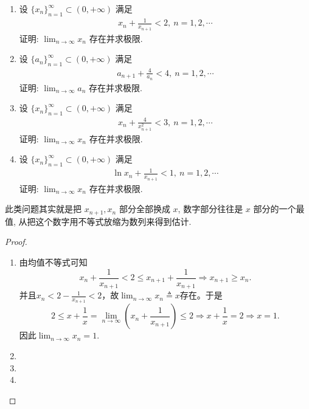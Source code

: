 \documentclass[../../main.tex]{subfiles}
\begin{document}
\begin{example}
\begin{enumerate}
\item 设 $\{x_n\}_{n=1}^{\infty} \subset (0,+\infty)$ 满足
\begin{align*}
x_n + \frac{1}{x_{n+1}} < 2,\ n = 1,2,\cdots
\end{align*}
证明: $\lim_{n \to \infty} x_n$ 存在并求极限.
\item 设 $\{a_n\}_{n=1}^{\infty} \subset (0,+\infty)$ 满足
\begin{align*}
a_{n+1} + \frac{4}{a_n} < 4,\ n = 1,2,\cdots
\end{align*}
证明: $\lim_{n \to \infty} a_n$ 存在并求极限.
\item 设 $\{x_n\}_{n=1}^{\infty} \subset (0,+\infty)$ 满足
\begin{align*}
x_n + \frac{4}{x_{n+1}^2} < 3,\ n = 1,2,\cdots
\end{align*}
证明: $\lim_{n \to \infty} x_n$ 存在并求极限.
\item 设 $\{x_n\}_{n=1}^{\infty} \subset (0,+\infty)$ 满足
\begin{align*}
\ln x_n + \frac{1}{x_{n+1}} < 1,\ n = 1,2,\cdots
\end{align*}
证明: $\lim_{n \to \infty} x_n$ 存在并求极限.
\end{enumerate}
\end{example}
\begin{note}
此类问题其实就是把 $x_{n+1}, x_n$ 部分全部换成 $x$, 数字部分往往是 $x$ 部分的一个最值, 从把这个数字用不等式放缩为数列来得到估计.
\end{note}
\begin{proof}
\begin{enumerate}
\item 由均值不等式可知
$$x_n + \frac{1}{x_{n+1}} < 2 \leqslant x_{n+1} + \frac{1}{x_{n+1}} \Rightarrow x_{n+1} \geqslant x_n.$$
并且$x_n < 2 - \frac{1}{x_{n+1}} < 2$，故$\lim_{n \to \infty} x_n \triangleq x$存在。于是
$$2 \leqslant x + \frac{1}{x} = \lim_{n \to \infty} \left( x_n + \frac{1}{x_{n+1}} \right) \leqslant 2 \Rightarrow x + \frac{1}{x} = 2 \Rightarrow x = 1.$$
因此$\lim_{n \to \infty} x_n = 1.$

\item 

\item 

\item 
\end{enumerate}
\end{proof}
\end{document}

